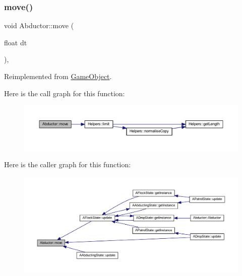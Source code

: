 \subsubsection{\texorpdfstring{move()}{move()}}
{\footnotesize\ttfamily void Abductor\+::move (\begin{DoxyParamCaption}\item[{float}]{dt }\end{DoxyParamCaption})\hspace{0.3cm}{\ttfamily [override]}, {\ttfamily [virtual]}}



Reimplemented from \hyperlink{class_game_object_abebe08f70e334c52b8bf052b6ef8c6f3}{Game\+Object}.

Here is the call graph for this function\+:
\nopagebreak
\begin{figure}[H]
\begin{center}
\leavevmode
\includegraphics[width=350pt]{class_abductor_a10bb137ba1b1707466f0a893052a0b30_cgraph}
\end{center}
\end{figure}
Here is the caller graph for this function\+:
\nopagebreak
\begin{figure}[H]
\begin{center}
\leavevmode
\includegraphics[width=350pt]{class_abductor_a10bb137ba1b1707466f0a893052a0b30_icgraph}
\end{center}
\end{figure}
\mbox{\label{class_abductor_acc2841707aaeb5719ecc615b5fe6bf56}} 
